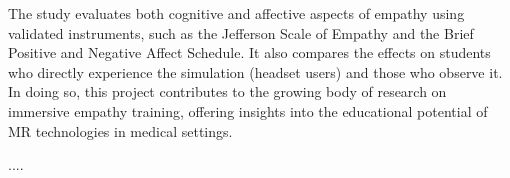 The study evaluates both cognitive and affective aspects of empathy using validated instruments, such as the Jefferson Scale of Empathy and the Brief Positive and Negative Affect Schedule. It also compares the effects on students who directly experience the simulation (headset users) and those who observe it. In doing so, this project contributes to the growing body of research on immersive empathy training, offering insights into the educational potential of MR technologies in medical settings.


....
